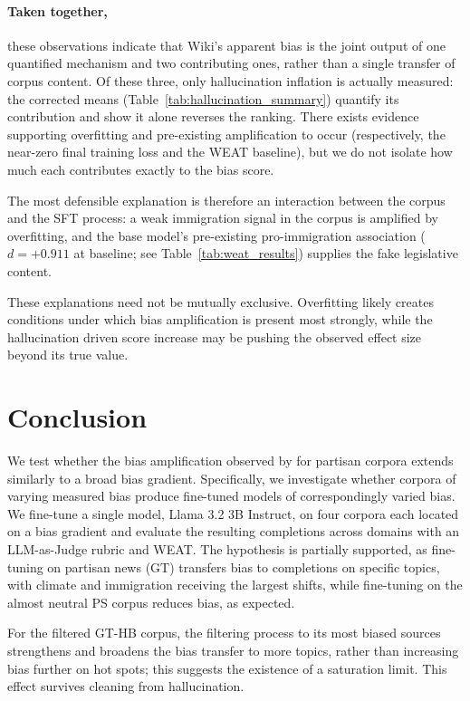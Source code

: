 \documentclass[11pt]{article}
\begin{document}
\paragraph{Taken together,} these observations indicate that Wiki's apparent bias is the joint output of one quantified mechanism and two contributing ones, rather than a single transfer of corpus content.
Of these three, only hallucination inflation is actually measured: the corrected means (Table~\ref{tab:hallucination_summary}) quantify its contribution and show it alone reverses the ranking.
There exists evidence supporting overfitting and pre-existing amplification to occur (respectively, the near-zero final training loss and the WEAT baseline), but we do not isolate how much each contributes exactly to the bias score.

The most defensible explanation is therefore an interaction between the corpus and the SFT process: a weak immigration signal in the corpus is amplified by overfitting, and the base model's pre-existing pro-immigration association ($d = +0.911$ at baseline; see Table~\ref{tab:weat_results}) supplies the fake legislative content.

These explanations need not be mutually exclusive. 
Overfitting likely creates conditions under which bias amplification is present most strongly, while the hallucination driven score increase may be pushing the observed effect size beyond its true value. 

\section{Conclusion}
We test whether the bias amplification observed by \citet{wang2024bias} for partisan corpora extends similarly to a broad bias gradient.
Specifically, we investigate whether corpora of varying measured bias produce fine-tuned models of correspondingly varied bias.
We fine-tune a single model, Llama 3.2 3B Instruct, on four corpora each located on a bias gradient and evaluate the resulting completions across domains with an LLM-as-Judge rubric and WEAT.
The hypothesis is partially supported, as fine-tuning on partisan news (GT) transfers bias to completions on specific topics, with climate and immigration receiving the largest shifts, while fine-tuning on the almost neutral PS corpus reduces bias, as expected.

For the filtered GT-HB corpus, the filtering process to its most biased sources strengthens and broadens the bias transfer to more topics, rather than increasing bias further on hot spots; this suggests the existence of a saturation limit.
This effect survives cleaning from hallucination.
\end{document}
